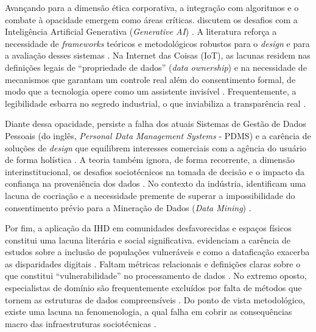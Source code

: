 \documentclass[
	12pt,				%
	oneside,			%
	a4paper,			%
	english,			%
	brazil				%
	]{abntex2ppgsi}
\begin{document}
    Avançando para a dimensão ética corporativa, a integração com algoritmos e o combate à opacidade emergem como áreas críticas.  discutem os desafios com a Inteligência Artificial Generativa (\textit{Generative AI}) \cite{Locoro2020}. A literatura reforça a necessidade de \textit{frameworks} teóricos e metodológicos robustos para o \textit{design} e para a avaliação desses sistemas \cite{Strey2019Human, malgieri2019automated, Lindley2020, Coleti2020TR}. Na Internet das Coisas (IoT), as lacunas residem nas definições legais de ``propriedade de dados'' (\textit{data ownership}) e na necessidade de mecanismos que garantam um controle real além do consentimento formal, de modo que a tecnologia opere como um assistente invisível \cite{janecek2018ownership}. Frequentemente, a legibilidade esbarra no segredo industrial, o que inviabiliza a transparência real \cite{Coleti2020TR, Barreto2018}. 

    Diante dessa opacidade, persiste a falha dos atuais Sistemas de Gestão de Dados Pessoais (do inglês, \textit{Personal Data Management Systems} - PDMS) e a carência de soluções de \textit{design} que equilibrem interesses comerciais com a agência do usuário de forma holística \cite{angelopoulos2021stewardship, Crabtree2016}. A teoria também ignora, de forma recorrente, a dimensão interinstitucional, os desafios sociotécnicos na tomada de decisão e o impacto da confiança na proveniência dos dados \cite{sailaja2021exploring, mu2024institutional, Briggs2021, Seidelin2018}. No contexto da indústria,  identificam uma lacuna de cocriação e a necessidade premente de superar a impossibilidade do consentimento prévio para a Mineração de Dados (\textit{Data Mining}) \cite{Calvetti2021173, Locoro2020, Hutton2017}.

    Por fim, a aplicação da IHD em comunidades desfavorecidas e espaços físicos constitui uma lacuna literária e social significativa.  evidenciam a carência de estudos sobre a inclusão de populações vulneráveis e como a dataficação exacerba as disparidades digitais \cite{Locoro2020}. Faltam métricas relacionais e definições claras sobre o que constitui ``vulnerabilidade'' no processamento de dados \cite{malgieri2020vulnerable, Locoro2020}. No extremo oposto, especialistas de domínio são frequentemente excluídos por falta de métodos que tornem as estruturas de dados compreensíveis \cite{seidelin2020foregrounding}. Do ponto de vista metodológico, existe uma lacuna na fenomenologia, a qual falha em cobrir as consequências macro das infraestruturas sociotécnicas \cite{Parviainen2016}. 
\end{document}
